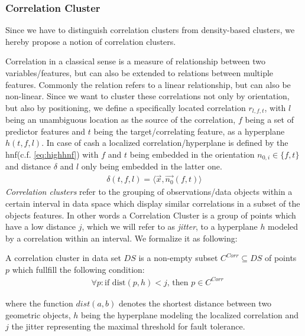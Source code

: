 \subsubsection*{Correlation Cluster}
Since we have to distinguish correlation clusters from density-based clusters, we hereby propose a notion of correlation clusters.

Correlation in a classical sense is a measure of relationship between two variables/features, but can also be extended to relations between multiple features. Commonly the relation refers to a linear relationship, but can also be non-linear. Since we want to cluster these correlations not only by orientation, but also by positioning, we define a specifically located correlation $r_{l,f,t}$, with $l$ being an unambiguous location as the source of the correlation, $f$ being a set of predictor features and $t$ being the target/correlating feature, as a hyperplane $h(t,f,l)$. In case of \gls{cash} a localized correlation/hyperplane is defined by the \gls{hnf}(c.f. \autoref{eq:highhnf}) with $f$ and $t$ being embedded in the orientation $n_{0,i} \in \{f,t\}$ and distance $\delta$ and $l$ only being embedded in the latter one. 
\begin{align}
    \delta(t,f,l) = \langle \vec{x},\vec{n_0}(f,t) \rangle
\end{align}
\textit{Correlation clusters} refer to the grouping of observations/data objects within a certain interval in data space which display similar correlations in a subset of the objects features. In other words a Correlation Cluster is a group of points which have a low distance $j$, which we will refer to as \textit{jitter}, to a hyperplane $h$ modeled by a correlation within an interval. We formalize it as following:

A correlation cluster in data set $DS$ is a non-empty subset $C^{Corr} \subseteq DS$ of points $p$ which fullfill the following condition:
\begin{align}
    &\forall p: \text{if } \text{dist}(p,h) < j \text{, then } p \in C^{Corr}
\end{align}

where the function $dist(a,b)$ denotes the shortest distance between two geometric objects, $h$ being the hyperplane modeling the localized correlation and $j$ the jitter representing the maximal threshold for fault tolerance.


